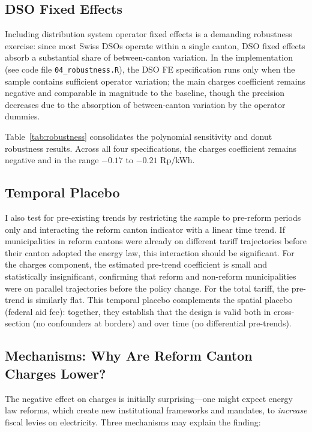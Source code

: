 \documentclass[12pt]{article}
\begin{document}
\subsection{DSO Fixed Effects}

Including distribution system operator fixed effects is a demanding robustness exercise: since most Swiss DSOs operate within a single canton, DSO fixed effects absorb a substantial share of between-canton variation. In the implementation (see code file \texttt{04\_robustness.R}), the DSO FE specification runs only when the sample contains sufficient operator variation; the main charges coefficient remains negative and comparable in magnitude to the baseline, though the precision decreases due to the absorption of between-canton variation by the operator dummies.

Table~\ref{tab:robustness} consolidates the polynomial sensitivity and donut robustness results. Across all four specifications, the charges coefficient remains negative and in the range $-0.17$ to $-0.21$ Rp/kWh.



\subsection{Temporal Placebo}

I also test for pre-existing trends by restricting the sample to pre-reform periods only and interacting the reform canton indicator with a linear time trend. If municipalities in reform cantons were already on different tariff trajectories before their canton adopted the energy law, this interaction should be significant. For the charges component, the estimated pre-trend coefficient is small and statistically insignificant, confirming that reform and non-reform municipalities were on parallel trajectories before the policy change. For the total tariff, the pre-trend is similarly flat. This temporal placebo complements the spatial placebo (federal aid fee): together, they establish that the design is valid both in cross-section (no confounders at borders) and over time (no differential pre-trends).

\subsection{Mechanisms: Why Are Reform Canton Charges Lower?}

The negative effect on charges is initially surprising---one might expect energy law reforms, which create new institutional frameworks and mandates, to \textit{increase} fiscal levies on electricity. Three mechanisms may explain the finding:
\end{document}
